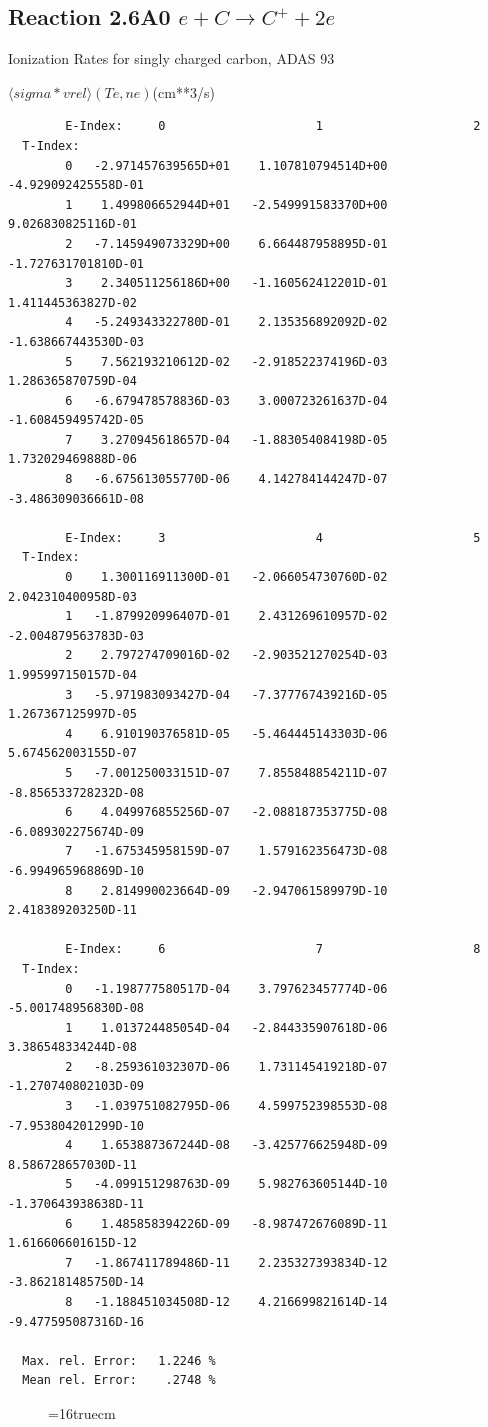\documentclass[12pt,dvips]{article}
\begin{document}
\subsection{
Reaction 2.6A0 $e + C \rightarrow C^+  + 2e $
}
  Ionization Rates for singly charged carbon,
  ADAS 93

$  \langle sigma*vrel \rangle(Te,ne) $(cm**3/s)
\begin{small}\begin{verbatim}
        E-Index:     0                     1                     2
  T-Index:
        0   -2.971457639565D+01    1.107810794514D+00   -4.929092425558D-01
        1    1.499806652944D+01   -2.549991583370D+00    9.026830825116D-01
        2   -7.145949073329D+00    6.664487958895D-01   -1.727631701810D-01
        3    2.340511256186D+00   -1.160562412201D-01    1.411445363827D-02
        4   -5.249343322780D-01    2.135356892092D-02   -1.638667443530D-03
        5    7.562193210612D-02   -2.918522374196D-03    1.286365870759D-04
        6   -6.679478578836D-03    3.000723261637D-04   -1.608459495742D-05
        7    3.270945618657D-04   -1.883054084198D-05    1.732029469888D-06
        8   -6.675613055770D-06    4.142784144247D-07   -3.486309036661D-08

        E-Index:     3                     4                     5
  T-Index:
        0    1.300116911300D-01   -2.066054730760D-02    2.042310400958D-03
        1   -1.879920996407D-01    2.431269610957D-02   -2.004879563783D-03
        2    2.797274709016D-02   -2.903521270254D-03    1.995997150157D-04
        3   -5.971983093427D-04   -7.377767439216D-05    1.267367125997D-05
        4    6.910190376581D-05   -5.464445143303D-06    5.674562003155D-07
        5   -7.001250033151D-07    7.855848854211D-07   -8.856533728232D-08
        6    4.049976855256D-07   -2.088187353775D-08   -6.089302275674D-09
        7   -1.675345958159D-07    1.579162356473D-08   -6.994965968869D-10
        8    2.814990023664D-09   -2.947061589979D-10    2.418389203250D-11

        E-Index:     6                     7                     8
  T-Index:
        0   -1.198777580517D-04    3.797623457774D-06   -5.001748956830D-08
        1    1.013724485054D-04   -2.844335907618D-06    3.386548334244D-08
        2   -8.259361032307D-06    1.731145419218D-07   -1.270740802103D-09
        3   -1.039751082795D-06    4.599752398553D-08   -7.953804201299D-10
        4    1.653887367244D-08   -3.425776625948D-09    8.586728657030D-11
        5   -4.099151298763D-09    5.982763605144D-10   -1.370643938638D-11
        6    1.485858394226D-09   -8.987472676089D-11    1.616606601615D-12
        7   -1.867411789486D-11    2.235327393834D-12   -3.862181485750D-14
        8   -1.188451034508D-12    4.216699821614D-14   -9.477595087316D-16

  Max. rel. Error:   1.2246 %
  Mean rel. Error:    .2748 %
\end{verbatim}\end{small}
\begin{figure} \label{2.6A0}
\epsfxsize=16truecm
\end{figure}
\newpage
\end{document}
